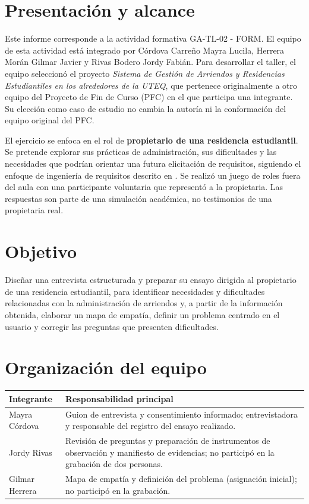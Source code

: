 \documentclass[12pt,a4paper]{article}
\begin{document}
\section{Presentación y alcance}
Este informe corresponde a la actividad formativa GA-TL-02 - FORM. El equipo de esta actividad está integrado por Córdova Carreño Mayra Lucila, Herrera Morán Gilmar Javier y Rivas Bodero Jordy Fabián. Para desarrollar el taller, el equipo seleccionó el proyecto \emph{Sistema de Gestión de Arriendos y Residencias Estudiantiles en los alrededores de la UTEQ}, que pertenece originalmente a otro equipo del Proyecto de Fin de Curso (PFC) en el que participa una integrante. Su elección como caso de estudio no cambia la autoría ni la conformación del equipo original del PFC.

El ejercicio se enfoca en el rol de \textbf{propietario de una residencia estudiantil}. Se pretende explorar sus prácticas de administración, sus dificultades y las necesidades que podrían orientar una futura elicitación de requisitos, siguiendo el enfoque de ingeniería de requisitos descrito en \cite{ieee29148,pohl2010}. Se realizó un juego de roles fuera del aula con una participante voluntaria que representó a la propietaria. Las respuestas son parte de una simulación académica, no testimonios de una propietaria real.

\section{Objetivo}
Diseñar una entrevista estructurada y preparar su ensayo dirigida al propietario de una residencia estudiantil, para identificar necesidades y dificultades relacionadas con la administración de arriendos y, a partir de la información obtenida, elaborar un mapa de empatía, definir un problema centrado en el usuario y corregir las preguntas que presenten dificultades.

\section{Organización del equipo}
\begin{tabularx}{\linewidth}{|p{3.0cm}|X|}
\hline
\textbf{Integrante} & \textbf{Responsabilidad principal} \\ \hline
Mayra Córdova & Guion de entrevista y consentimiento informado; entrevistadora y responsable del registro del ensayo realizado. \\ \hline
Jordy Rivas & Revisión de preguntas y preparación de instrumentos de observación y manifiesto de evidencias; no participó en la grabación de dos personas. \\ \hline
Gilmar Herrera & Mapa de empatía y definición del problema (asignación inicial); no participó en la grabación. \\ \hline
\end{tabularx}
\end{document}
